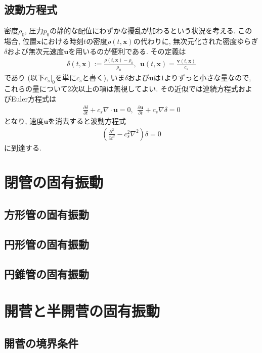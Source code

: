 \documentclass[a4paper,uplatex,dvipdfmx]{jsarticle}
\newcommand{\x}{\bm{x}}
\renewcommand{\v}{\bm{v}}
\renewcommand{\u}{\bm{u}}
\begin{document}
\subsection{波動方程式}\label{sec: wave equation}

密度$\rho_0$, 圧力$p_0$の静的な配位にわずかな擾乱が加わるという状況を考える.
この場合, 位置$\x$における時刻$t$の密度$\rho ( t, \x )$の代わりに, 無次元化された密度ゆらぎ$\delta$および無次元速度$\u$を用いるのが便利である. その定義は
\begin{align}
	\delta ( t, \x ) := \frac{ \rho ( t, \x ) - \rho_0 }{ \rho_0 } , \ \ \u ( t, \x ) = \frac{ \v ( t, \x ) }{ c_s }
\end{align}
であり (以下$c_s |_0$を単に$c_s$と書く), いま$\delta$および$\u$は$1$よりずっと小さな量なので, これらの量について$2$次以上の項は無視してよい.
その近似では連続方程式およびEuler方程式は
\begin{align}
	\frac{ \partial \delta }{ \partial t } + c_s \nabla \cdot \u = 0 , \ \
	\frac{ \partial \u }{ \partial t } + c_s \nabla \delta = 0
\end{align}
となり, 速度$\u$を消去すると波動方程式
\begin{align}
	\left( \frac{ \partial^2 }{ \partial t^2} - c_s^2 \nabla^2 \right) \delta = 0
\end{align}
に到達する.


\section{閉管の固有振動}

\subsection{方形管の固有振動}

\subsection{円形管の固有振動}

\subsection{円錐管の固有振動}


\section{開菅と半開菅の固有振動}

\subsection{開菅の境界条件}
\end{document}
